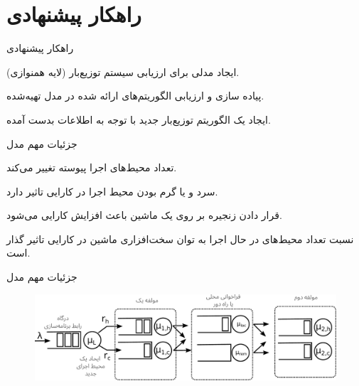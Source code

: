 \section{راهکار پیشنهادی}

\begin{frame}{راهکار پیشنهادی}
	\begin{itemize}\RTList
		 ایجاد مدلی برای ارزیابی سیستم توزیع‌بار (لایه همنوازی).
		
		 پیاده سازی و ارزیابی الگوریتم‌های ارائه شده در مدل تهیه‌شده.
		
		 ایجاد یک الگوریتم توزیع‌بار جدید با توجه به اطلاعات بدست آمده.
	\end{itemize}
\end{frame}

\begin{frame}{جزئیات مهم مدل}
	\begin{itemize}\RTList
		 تعداد محیط‌های اجرا پیوسته تغییر می‌کند.
		
		 سرد و یا گرم بودن محیط اجرا در کارایی تاثیر دارد.
		
		 قرار دادن زنجیره بر روی یک ماشین باعث افزایش کارایی می‌شود.

		 نسبت تعداد محیط‌های در حال اجرا به توان سخت‌افزاری ماشین در کارایی تاثیر گذار است.
	\end{itemize}
\end{frame}

\begin{frame}{جزئیات مهم مدل}
	\begin{figure}[!h]
		\centering
		\includegraphics[width=0.8\linewidth]{res/queuing_model.pdf}
	\end{figure}
\end{frame}

